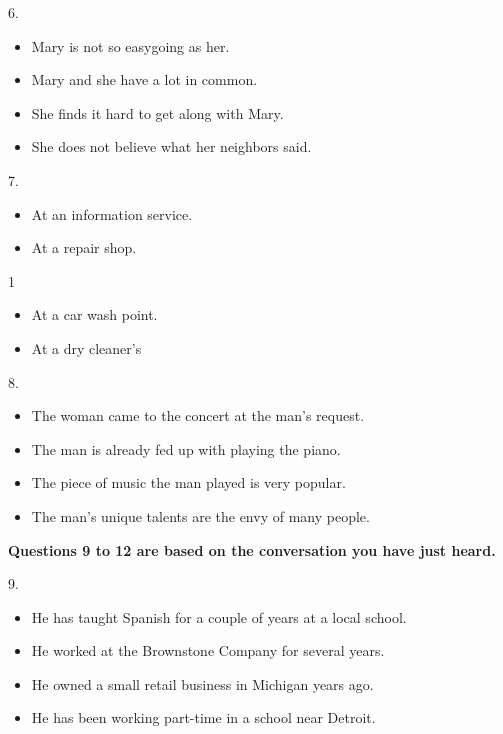 \documentclass[UTF8,11pt]{ctexart}
\begin{document}
6.


\begin{itemize}[leftmargin=2em,itemsep=.2em,topsep=.4em]\item[A.] Mary is not so easygoing as her.
\item[B.] Mary and she have a lot in common.
\item[C.] She finds it hard to get along with Mary.
\item[D.] She does not believe what her neighbors said.
\end{itemize}

7.


\begin{itemize}[leftmargin=2em,itemsep=.2em,topsep=.4em]\item[A.] At an information service.
\item[C.] At a repair shop.
\end{itemize}

1


\begin{itemize}[leftmargin=2em,itemsep=.2em,topsep=.4em]\item[B.] At a car wash point.
\item[D.] At a dry cleaner's
\end{itemize}

8.


\begin{itemize}[leftmargin=2em,itemsep=.2em,topsep=.4em]\item[A.] The woman came to the concert at the man’s request.
\item[B.] The man is already fed up with playing the piano.
\item[C.] The piece of music the man played is very popular.
\item[D.] The man’s unique talents are the envy of many people.
\end{itemize}

\textbf{Questions 9 to 12 are based on the conversation you have just heard.}


9.


\begin{itemize}[leftmargin=2em,itemsep=.2em,topsep=.4em]\item[A.] He has taught Spanish for a couple of years at a local school.
\item[B.] He worked at the Brownstone Company for several years.
\item[C.] He owned a small retail business in Michigan years ago.
\item[D.] He has been working part-time in a school near Detroit.
\end{itemize}
\end{document}
